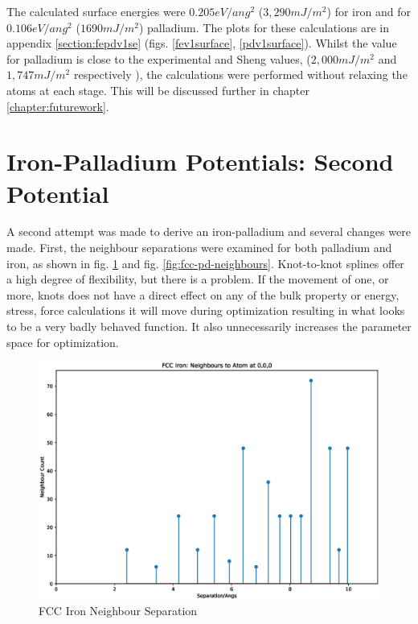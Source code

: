 The calculated surface energies were $0.205eV/ang^2$ ($3,290 mJ/m^2$) for iron and for $0.106eV/ang^2$ ($1690 mJ/m^2$) palladium.  The plots for these calculations are in appendix \ref{section:fepdv1se} (figs. \ref{fev1surface}, \ref{pdv1surface}).  Whilst the value for palladium is close to the experimental and Sheng values, ($2,000 mJ/m^2$ and $1,747 mJ/m^2$ respectively \cite{shengeamonline}), the calculations were performed without relaxing the atoms at each stage.  This will be discussed further in chapter \ref{chapter:futurework}.





\FloatBarrier
\section{Iron-Palladium Potentials: Second Potential}

A second attempt was made to derive an iron-palladium and several changes were made.  First, the neighbour separations were examined for both palladium and iron, as shown in fig. \ref{fig:fcc-fe-neighbours} and fig. \ref{fig:fcc-pd-neighbours}.  Knot-to-knot splines offer a high degree of flexibility, but there is a problem.  If the movement of one, or more, knots does not have a direct effect on any of the bulk property or energy, stress, force calculations it will move during optimization resulting in what looks to be a very badly behaved function.  It also unnecessarily increases the parameter space for optimization.

\begin{figure}[htp]
  \begin{center}
    \includegraphics[scale=0.55]{chapters/results_potential_fitting/neighbours/fe.eps}
    \caption{FCC Iron Neighbour Separation}
    \label{fig:fcc-fe-neighbours}
  \end{center}
\end{figure}

